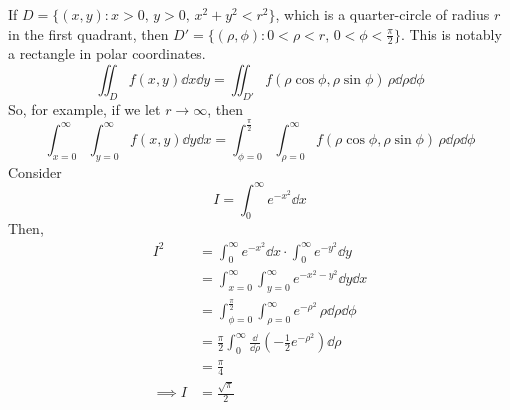 If \(D = \{ (x, y) \colon x > 0,\, y > 0,\, x^2 + y^2 < r^2 \}\), which is a quarter-circle of radius \(r\) in the first quadrant, then \(D' = \{ (\rho, \phi) \colon 0 < \rho < r,\, 0 < \phi < \frac{\pi}{2} \}\).
This is notably a rectangle in polar coordinates.
\[
	\iint_D f(x, y)\dd{x} \dd{y} = \iint_{D'} f(\rho \cos \phi, \rho \sin \phi) \,\rho \dd{\rho} \dd{\phi}
\]
So, for example, if we let \(r \to \infty\), then
\[
	\int_{x=0}^\infty \int_{y=0}^\infty f(x, y) \dd{y}\dd{x} = \int_{\phi = 0}^{\frac{\pi}{2}} \int_{\rho = 0}^\infty f(\rho \cos \phi, \rho \sin \phi) \,\rho\dd{\rho}\dd{\phi}
\]
Consider
\[
	I = \int_0^\infty e^{-x^2} \dd{x}
\]
Then,
\begin{align*}
	I^2        & = \int_0^\infty e^{-x^2} \dd{x} \cdot \int_0^\infty e^{-y^2} \dd{y}                                  \\
	           & = \int_{x=0}^\infty \int_{y=0}^\infty e^{-x^2-y^2} \dd{y}\dd{x}                                      \\
	           & = \int_{\phi = 0}^{\frac{\pi}{2}} \int_{\rho = 0}^\infty e^{-\rho^2} \,\rho\dd{\rho}\dd{\phi}        \\
	           & = \frac{\pi}{2} \int_0^\infty \frac{\dd}{\dd{\rho}} \left( -\frac{1}{2}e^{-\rho^2} \right) \dd{\rho} \\
	           & = \frac{\pi}{4}                                                                                      \\
	\implies I & = \frac{\sqrt{\pi}}{2}
\end{align*}
